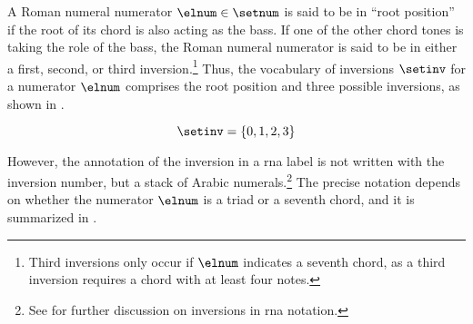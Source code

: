 
A Roman numeral numerator $\elnum \in \setnum$ is said to be
in ``root position'' if the root of its chord is also acting
as the bass. If one of the other chord tones is taking the
role of the bass, the Roman numeral numerator is said to be
in either a first, second, or third
inversion.\footnote{Third inversions only occur if $\elnum$
indicates a seventh chord, as a third inversion requires a
chord with at least four notes.} Thus, the vocabulary of
inversions $\setinv$ for a numerator $\elnum$ comprises the
root position and three possible inversions, as shown in
.

\begin{equation}
    \label{eq:inversion_vocabulary}
    \setinv = \{ 0, 1, 2, 3 \}
\end{equation}


However, the annotation of the inversion in a \gls{rna}
label is not written with the inversion number, but a stack
of Arabic numerals.\footnote{See
 for further
discussion on inversions in \gls{rna} notation.} The precise
notation depends on whether the numerator $\elnum$ is a
triad or a seventh chord, and it is summarized in
.


        

